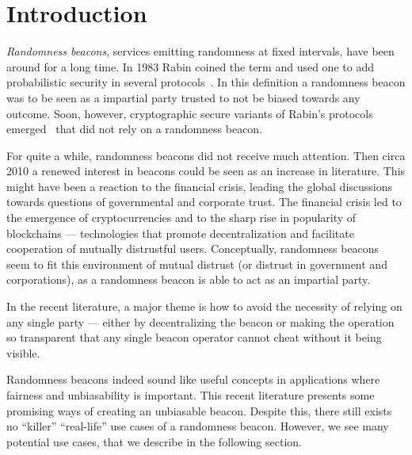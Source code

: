 \section{Introduction}

\emph{Randomness beacons}, services emitting randomness at fixed intervals, have been around for a long time.
In 1983 Rabin coined the term and used one to add probabilistic security in several protocols~\cite{rabin1983transaction}.
In this definition a randomness beacon was to be seen as a impartial party trusted to not be biased towards any outcome.
Soon, however, cryptographic secure variants of Rabin's protocols emerged~ that did not rely on a randomness beacon.

For quite a while, randomness beacons did not receive much attention. Then circa 2010 a renewed interest in beacons could be seen as an increase in literature.
This might have been a reaction to the financial crisis, leading the global discussions towards questions of governmental and corporate trust.
The financial crisis led to the emergence of cryptocurrencies and to the sharp rise in popularity of blockchains --- technologies that promote decentralization and facilitate cooperation of mutually distrustful users.
Conceptually, randomness beacons seem to fit this environment of mutual distrust (or distrust in government and corporations), as a randomness beacon is able to act as an impartial party.

In the recent literature, a major theme is how to avoid the necessity of relying on any single party --- either by decentralizing the beacon or making the operation so transparent that any single beacon operator cannot cheat without it being visible.


Randomness beacons indeed sound like useful concepts in applications where fairness and unbiasability is important.
This recent literature presents some promising ways of creating an unbiasable beacon. Despite this, there still exists no \enquote{killer} \enquote{real-life} use cases of a randomness beacon.  However, we see many potential use cases, that we describe in the following section.


